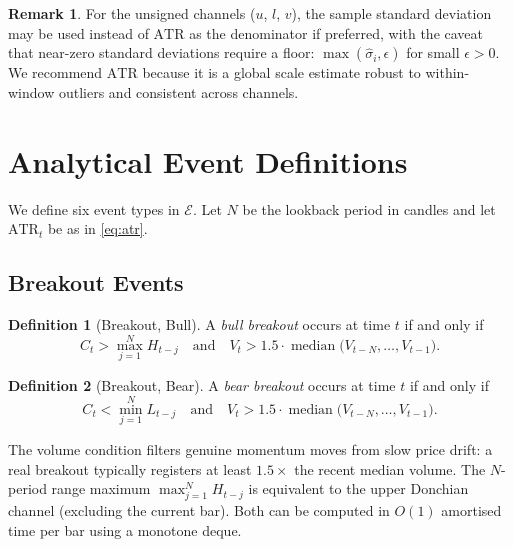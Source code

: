 \documentclass[11pt,a4paper]{article}
\theoremstyle{definition}
\newtheorem{definition}{Definition}[section]
\newtheorem{remark}{Remark}[section]
\theoremstyle{plain}
\newcommand{\med}{\operatorname{median}}
\begin{document}
\begin{remark}
For the unsigned channels ($u$, $l$, $v$), the sample standard deviation may be used
instead of $\mathrm{ATR}$ as the denominator if preferred, with the caveat that
near-zero standard deviations require a floor: $\max(\hat{\sigma}_i, \epsilon)$ for
small $\epsilon > 0$. We recommend $\mathrm{ATR}$ because it is a global scale estimate
robust to within-window outliers and consistent across channels.
\end{remark}

\section{Analytical Event Definitions}
\label{sec:events}

We define six event types in $\mathcal{E}$. Let $N$ be the lookback period in candles
and let $\mathrm{ATR}_t$ be as in \eqref{eq:atr}.

\subsection{Breakout Events}

\begin{definition}[Breakout, Bull]
\label{def:breakout_bull}
A \emph{bull breakout} occurs at time $t$ if and only if
\begin{equation}
    C_t > \max_{j=1}^{N} H_{t-j}
    \quad \text{and} \quad
    V_t > 1.5 \cdot \med\!\bigl(V_{t-N}, \ldots, V_{t-1}\bigr).
    \label{eq:breakout_bull}
\end{equation}
\end{definition}

\begin{definition}[Breakout, Bear]
\label{def:breakout_bear}
A \emph{bear breakout} occurs at time $t$ if and only if
\begin{equation}
    C_t < \min_{j=1}^{N} L_{t-j}
    \quad \text{and} \quad
    V_t > 1.5 \cdot \med\!\bigl(V_{t-N}, \ldots, V_{t-1}\bigr).
    \label{eq:breakout_bear}
\end{equation}
\end{definition}

The volume condition filters genuine momentum moves from slow price drift: a real
breakout typically registers at least $1.5\times$ the recent median volume. The
$N$-period range maximum $\max_{j=1}^{N} H_{t-j}$ is equivalent to the upper Donchian
channel (excluding the current bar). Both can be computed in $O(1)$ amortised time per
bar using a monotone deque.
\end{document}
